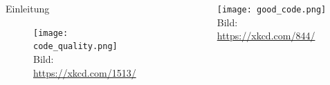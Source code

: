 

\usepackage{verbatim}
\usetikzlibrary{decorations.pathreplacing}
\usetikzlibrary{shapes.misc}



\begin{titleframe}
	\vspace{3mm}
	\begin{columns}
		\begin{column}{6cm}
			\vspace{4.32mm}
			\begin{center}
				{\huge Einleitung}
			\end{center}
			\begin{figure}
				\centering
				\texttt{[image: code\_quality.png]}
				\\	\sffamily \tiny Bild: \href{https://xkcd.com/1513/}{https://xkcd.com/1513/}
			\end{figure}
		\end{column}
		\begin{column}{3.5cm}
			\vspace{-0.3mm}
			\begin{figure}
				\centering
				\texttt{[image: good\_code.png]}
				\\	\sffamily \tiny Bild: \href{https://xkcd.com/844/}{https://xkcd.com/844/}
			\end{figure}
		\end{column}
	\end{columns}

\end{titleframe}

\tocslide

